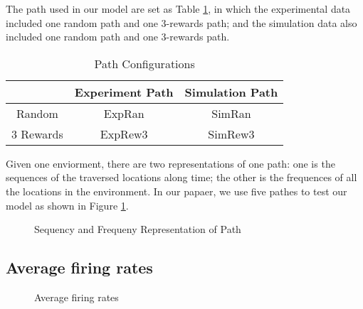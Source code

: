 \documentclass[11pt, letterpaper, onecolumn]{article}
\begin{document}
The path used in our model are set as Table \ref{tab:path}, in which the experimental data included one random path and one 3-rewards path; and the simulation data also included one random path and one 3-rewards path.
\begin{table}[!htbp]
\centering
\caption{Path Configurations}
\label{tab:path}
\begin{tabular}{c|c|c}
\hline
        & Experiment Path & Simulation Path \\ \hline
        Random & ExpRan & SimRan \\ \hline
        3 Rewards & ExpRew3 & SimRew3 \\ \hline
\end{tabular}
\end{table}

Given one enviorment, there are two representations of one path: one is the sequences of the traversed locations along time; the other is the frequences of all the locations in the environment. In our papaer, we use five pathes to test our model as shown in Figure \ref{fig:path}.

\begin{figure}[!htbp]
\centering
{}
\caption{Sequency and Frequeny Representation of Path}
\label{fig:path}
\end{figure}

\subsection{Average firing rates}
\begin{figure}[!htbp]
\centering
{}
\caption{Average firing rates}
\label{fig:firing}
\end{figure}
\end{document}

